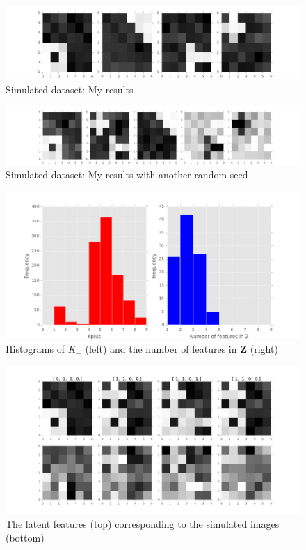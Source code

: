 \begin{figure}[!ht]
\centering
    \includegraphics[width=\linewidth]{Version1_Naive_Code/IBP_image_results.png}
    \caption{Simulated dataset: My results}
    \label{fig:imageresults}
\end{figure}

\begin{figure}[!ht]
\centering
    \includegraphics[width=\linewidth]{Version0_Wrong/IBP_image_results_K5.png}
    \caption{Simulated dataset: My results with another random seed}
    \label{fig:imageresultsK5}
\end{figure}

\begin{figure}[!ht]
\centering
    \includegraphics[width=0.8\linewidth]{Reverse/IBP_Histograms.png}
    \caption{Histograms of $K_+$ (left) and the number of features in $\mathbf{Z}$ (right)}
    \label{fig:hist}
\end{figure}

\begin{figure}[!ht]
\centering
    \includegraphics[width=\linewidth]{Reverse/IBP_Reverse_Images.png}
    \caption{The latent features (top) corresponding to the simulated images (bottom)}
    \label{fig:reverse}
\end{figure}
